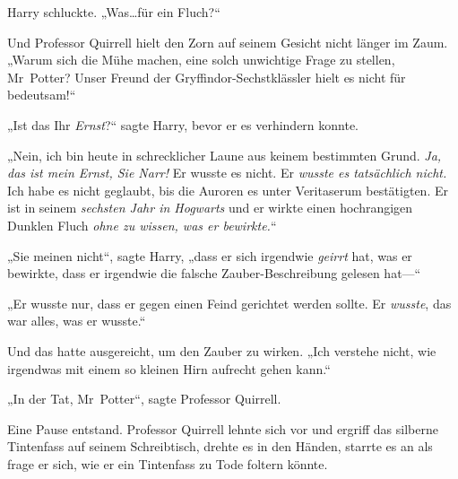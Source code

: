 Harry schluckte. „Was…für ein Fluch?“

Und Professor Quirrell hielt den Zorn auf seinem Gesicht nicht länger im Zaum. „Warum sich die Mühe machen, eine solch unwichtige Frage zu stellen, Mr~Potter? Unser Freund der Gryffindor-Sechstklässler hielt es nicht für bedeutsam!“

„Ist das Ihr \emph{Ernst}?“ sagte Harry, bevor er es verhindern konnte.

„Nein, ich bin heute in schrecklicher Laune aus keinem bestimmten Grund. \emph{Ja, das ist mein Ernst, Sie Narr!} Er wusste es nicht. Er \emph{wusste es tatsächlich nicht.} Ich habe es nicht geglaubt, bis die Auroren es unter Veritaserum bestätigten. Er ist in seinem \emph{sechsten Jahr in Hogwarts} und er wirkte einen hochrangigen Dunklen Fluch \emph{ohne zu wissen, was er bewirkte.}“

„Sie meinen nicht“, sagte Harry, „dass er sich irgendwie \emph{geirrt} hat, was er bewirkte, dass er irgendwie die falsche Zauber-Beschreibung gelesen hat—“

„Er wusste nur, dass er gegen einen Feind gerichtet werden sollte. Er \emph{wusste}, das war alles, was er wusste.“

Und das hatte ausgereicht, um den Zauber zu wirken. „Ich verstehe nicht, wie irgendwas mit einem so kleinen Hirn aufrecht gehen kann.“

„In der Tat, Mr~Potter“, sagte Professor Quirrell.

Eine Pause entstand. Professor Quirrell lehnte sich vor und ergriff das silberne Tintenfass auf seinem Schreibtisch, drehte es in den Händen, starrte es an als frage er sich, wie er ein Tintenfass zu Tode foltern könnte.

